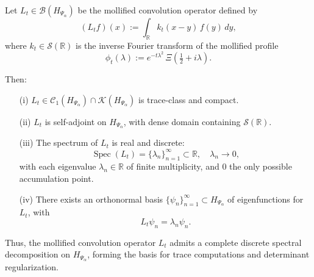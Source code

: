 \begin{proposition}
\label{prop:spectrum_Lt_real_discrete}
Let \( L_t \in \mathcal{B}(H_{\Psi_\alpha}) \) be the mollified convolution operator defined by
\[
(L_t f)(x) := \int_{\mathbb{R}} k_t(x - y)\, f(y)\, dy,
\]
where \( k_t \in \mathcal{S}(\mathbb{R}) \) is the inverse Fourier transform of the mollified profile
\[
\phi_t(\lambda) := e^{-t\lambda^2} \, \Xi\left( \tfrac{1}{2} + i\lambda \right).
\]

Then:
\begin{enumerate}
    \item[\textnormal{(i)}] \( L_t \in \mathcal{C}_1(H_{\Psi_\alpha}) \cap \mathcal{K}(H_{\Psi_\alpha}) \) is trace-class and compact.

    \item[\textnormal{(ii)}] \( L_t \) is self-adjoint on \( H_{\Psi_\alpha} \), with dense domain containing \( \mathcal{S}(\mathbb{R}) \).

    \item[\textnormal{(iii)}] The spectrum of \( L_t \) is real and discrete:
    \[
    \operatorname{Spec}(L_t) = \{ \lambda_n \}_{n=1}^\infty \subset \mathbb{R}, \quad \lambda_n \to 0,
    \]
    with each eigenvalue \( \lambda_n \in \mathbb{R} \) of finite multiplicity, and \( 0 \) the only possible accumulation point.

    \item[\textnormal{(iv)}] There exists an orthonormal basis \( \{ \psi_n \}_{n=1}^\infty \subset H_{\Psi_\alpha} \) of eigenfunctions for \( L_t \), with
    \[
    L_t \psi_n = \lambda_n \psi_n.
    \]
\end{enumerate}

\noindent
Thus, the mollified convolution operator \( L_t \) admits a complete discrete spectral decomposition on \( H_{\Psi_\alpha} \), forming the basis for trace computations and determinant regularization.
\end{proposition}
% 